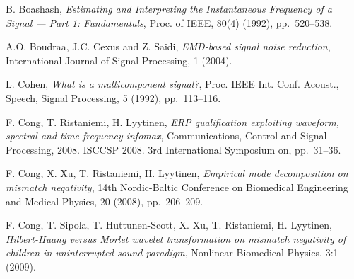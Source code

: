 \begin{thebibliography}{99}

B. Boashash, \textit{Estimating and Interpreting the Instantaneous Frequency of a Signal --- Part 1: Fundamentals}, Proc. of IEEE, 80(4) (1992), pp.~520--538.

A.O. Boudraa, J.C. Cexus and Z. Saidi, \textit{EMD-based signal noise reduction}, International Journal of Signal Processing, 1 (2004).

L. Cohen, \textit{What is a multicomponent signal?}, Proc. IEEE Int. Conf. Acoust., Speech, Signal Processing, 5 (1992), pp.~113--116.

F. Cong, T. Ristaniemi, H. Lyytinen, \textit{ERP qualification exploiting waveform, spectral and time-frequency infomax}, Communications, Control and Signal Processing, 2008. ISCCSP 2008. 3rd International Symposium on, pp.~31--36.

F. Cong, X. Xu, T. Ristaniemi, H. Lyytinen, \textit{Empirical mode decomposition on mismatch negativity}, 14th Nordic-Baltic Conference on Biomedical Engineering and Medical Physics, 20 (2008), pp.~206--209. 

F. Cong, T. Sipola, T. Huttunen-Scott, X. Xu, T. Ristaniemi, H. Lyytinen, \textit{Hilbert-Huang versus Morlet wavelet transformation on mismatch negativity of children in uninterrupted sound paradigm}, Nonlinear Biomedical Physics, 3:1 (2009). 

\end{thebibliography}
